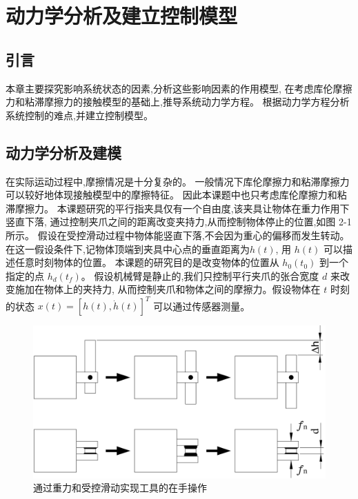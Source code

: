 \chapter{动力学分析及建立控制模型}

\section{引言}
本章主要探究影响系统状态的因素,分析这些影响因素的作用模型,
在考虑库伦摩擦力和粘滞摩擦力的接触模型的基础上,推导系统动力学方程。
根据动力学方程分析系统控制的难点,并建立控制模型。

\section{动力学分析及建模}

在实际运动过程中,摩擦情况是十分复杂的。
一般情况下库伦摩擦力和粘滞摩擦力可以较好地体现接触模型中的摩擦特征。
因此本课题中也只考虑库伦摩擦力和粘滞摩擦力。
本课题研究的平行指夹具仅有一个自由度,该夹具让物体在重力作用下竖直下落,
通过控制夹爪之间的距离改变夹持力,从而控制物体停止的位置,如图 2-1 所示。
假设在受控滑动过程中物体能竖直下落,不会因为重心的偏移而发生转动。
在这一假设条件下,记物体顶端到夹具中心点的垂直距离为$h(t)$,
用 $h(t)$ 可以描述任意时刻物体的位置。
本课题的研究目的是改变物体的位置从 ${h_0}({t_0})$ 到一个指定的点 ${h_d}({t_f})$。
假设机械臂是静止的,我们只控制平行夹爪的张合宽度 $d$ 来改变施加在物体上的夹持力,
从而控制夹爪和物体之间的摩擦力。假设物体在 $t$ 时刻的状态 $x(t) = {\left[ {h(t),\dot h(t)} \right]^T}$ 可以通过传感器测量。

\begin{figure}[!ht]
  \centering
  \includegraphics[scale=0.45]{chapter02/pic/2-1}
  \caption{通过重力和受控滑动实现工具的在手操作}
  \label{fig:2-1}
  \vspace{-0.3cm}
\end{figure}

